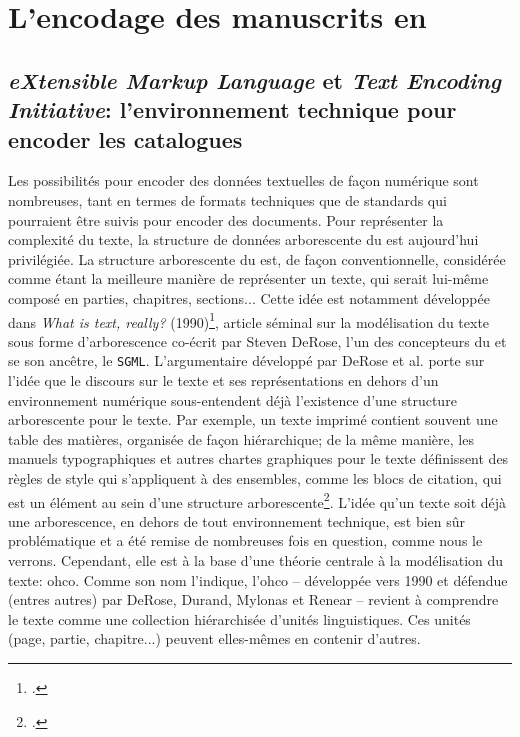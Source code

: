 \section{L'encodage des manuscrits en \xmltei{}}
\subsection{\textit{eXtensible Markup Language} et \textit{Text Encoding Initiative}: l'environnement technique pour encoder les catalogues}
Les possibilités pour encoder des données textuelles de façon numérique sont nombreuses, tant en termes de formats techniques que de standards qui pourraient être suivis pour encoder des documents. Pour représenter la complexité du texte, la structure de données arborescente du \xml{} est aujourd'hui privilégiée. La structure arborescente du \xml{} est, de façon conventionnelle, considérée comme étant la meilleure manière de représenter un texte, qui serait lui-même composé en parties, chapitres, sections... Cette idée est notamment développée dans \textit{What is text, really?} (1990)\footcite{derose_what_1990}, article séminal sur la modélisation du texte sous forme d'arborescence co-écrit par Steven DeRose, l'un des concepteurs du \xml{} et se son ancêtre, le \texttt{SGML}. L'argumentaire développé par DeRose et al. porte sur l'idée que le discours sur le texte et ses représentations en dehors d'un environnement numérique sous-entendent déjà l'existence d'une structure arborescente pour le texte. Par exemple, un texte imprimé contient souvent une table des matières, organisée de façon hiérarchique; de la même manière, les manuels typographiques et autres chartes graphiques pour le texte définissent des règles de style qui s'appliquent à des ensembles, comme les blocs de citation, qui est un élément au sein d'une structure arborescente\footcite[p. 4]{derose_what_1990}. L'idée qu'un texte soit déjà une arborescence, en dehors de tout environnement technique, est bien sûr problématique et a été remise de nombreuses fois en question, comme nous le verrons. Cependant, elle est à la base d'une théorie centrale à la modélisation du texte: \gls{ohco}. Comme son nom l'indique, l'\gls{ohco} -- développée vers 1990 et défendue (entres autres) par DeRose, Durand, Mylonas et Renear -- revient à comprendre le texte comme une collection hiérarchisée d'unités linguistiques. Ces unités (page, partie, chapitre...) peuvent elles-mêmes en contenir d'autres. 

